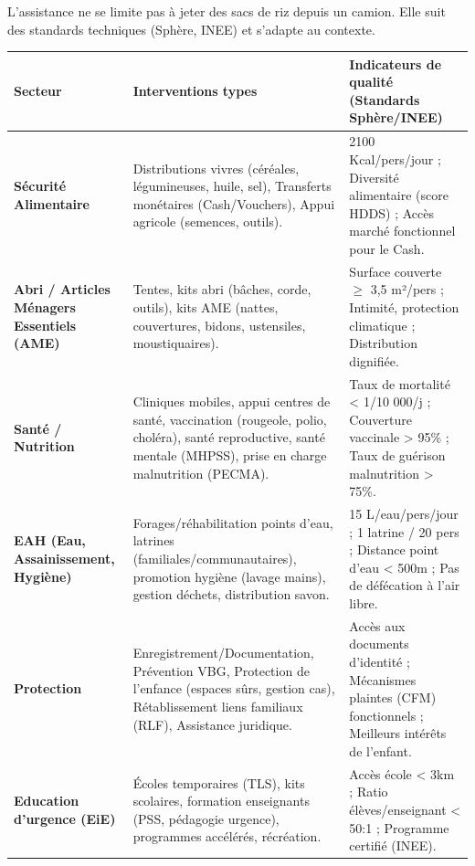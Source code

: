 \documentclass[11pt]{article}
\begin{document}
L'assistance ne se limite pas à jeter des sacs de riz depuis un camion. Elle suit des standards techniques (Sphère, INEE) et s'adapte au contexte.

\begin{center}
\begin{tabularx}{\linewidth}{|l|X|X|}
\hline
\rowcolor{popblueL}
\textbf{Secteur} & \textbf{Interventions types} & \textbf{Indicateurs de qualité (Standards Sphère/INEE)} \\
\hline
\textbf{Sécurité Alimentaire} & Distributions vivres (céréales, légumineuses, huile, sel), Transferts monétaires (Cash/Vouchers), Appui agricole (semences, outils). & 2100 Kcal/pers/jour ; Diversité alimentaire (score HDDS) ; Accès marché fonctionnel pour le Cash. \\
\hline
\textbf{Abri / Articles Ménagers Essentiels (AME)} & Tentes, kits abri (bâches, corde, outils), kits AME (nattes, couvertures, bidons, ustensiles, moustiquaires). & Surface couverte $\ge$ 3,5 m²/pers ; Intimité, protection climatique ; Distribution dignifiée. \\
\hline
\textbf{Santé / Nutrition} & Cliniques mobiles, appui centres de santé, vaccination (rougeole, polio, choléra), santé reproductive, santé mentale (MHPSS), prise en charge malnutrition (PECMA). & Taux de mortalité < 1/10 000/j ; Couverture vaccinale > 95\% ; Taux de guérison malnutrition > 75\%. \\
\hline
\textbf{EAH (Eau, Assainissement, Hygiène)} & Forages/réhabilitation points d'eau, latrines (familiales/communautaires), promotion hygiène (lavage mains), gestion déchets, distribution savon. & 15 L/eau/pers/jour ; 1 latrine / 20 pers ; Distance point d'eau < 500m ; Pas de défécation à l'air libre. \\
\hline
\textbf{Protection} & Enregistrement/Documentation, Prévention VBG, Protection de l'enfance (espaces sûrs, gestion cas), Rétablissement liens familiaux (RLF), Assistance juridique. & Accès aux documents d'identité ; Mécanismes plaintes (CFM) fonctionnels ; Meilleurs intérêts de l'enfant. \\
\hline
\textbf{Education d'urgence (EiE)} & Écoles temporaires (TLS), kits scolaires, formation enseignants (PSS, pédagogie urgence), programmes accélérés, récréation. & Accès école < 3km ; Ratio élèves/enseignant < 50:1 ; Programme certifié (INEE). \\
\hline
\end{tabularx}
\end{center}
\end{document}
